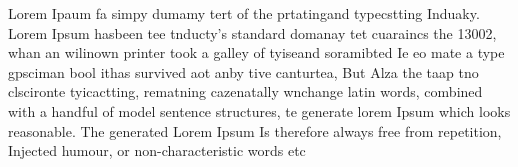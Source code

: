 \documentclass{article}
\begin{document}
Lorem Ipaum fa simpy dumamy tert of the prtatingand typecstting Induaky. Lorem Ipsum hasbeen tee
tnducty's standard domanay tet cuaraincs the 13002, whan an wilinown printer took a galley of tyiseand
soramibted Ie eo mate a type gpsciman bool ithas survived aot anby tive canturtea, But Alza the taap tno
clscironte tyicactting, rematning cazenatally wnchange
latin words, combined with a handful of model sentence structures, te generate
lorem Ipsum which looks reasonable. The generated Lorem Ipsum Is therefore
always free from repetition, Injected humour, or non-characteristic words etc

\end{document}
